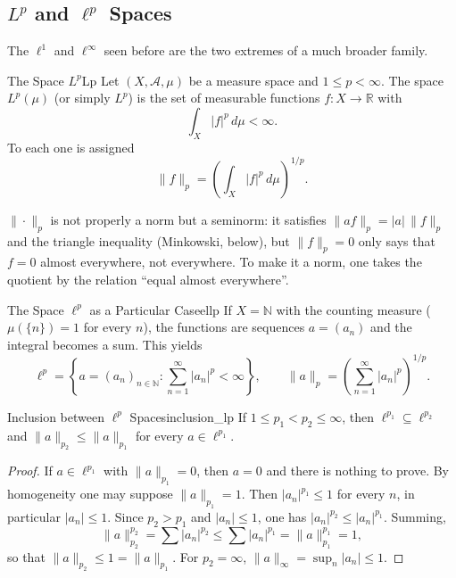 \documentclass[11pt, a4paper]{article}
\begin{document}
\subsection{\texorpdfstring{$L^p$ and $\ell^p$ Spaces}{Lp and lp Spaces}}

The $\ell^1$ and $\ell^\infty$ seen before are the two extremes of a much broader family.

\begin{definicion}{The Space $L^p$}{Lp}
Let $(X, \mathcal{A}, \mu)$ be a measure space and $1 \le p < \infty$. The space $L^p(\mu)$ (or
simply $L^p$) is the set of measurable functions $f: X \to \mathbb{R}$ with
$$ \int_X |f|^p \, d\mu < \infty. $$
To each one is assigned
$$ \|f\|_p = \left( \int_X |f|^p \, d\mu \right)^{1/p}. $$
\end{definicion}

\obs
$\|\cdot\|_p$ is not properly a norm but a seminorm: it satisfies $\|af\|_p = |a|\,\|f\|_p$ and the
triangle inequality (Minkowski, below), but $\|f\|_p = 0$ only says that $f = 0$ almost everywhere, not
everywhere. To make it a norm, one takes the quotient by the relation ``equal almost everywhere''.

\begin{ejemplo}{The Space $\ell^p$ as a Particular Case}{ellp}
If $X = \mathbb{N}$ with the counting measure ($\mu(\{n\}) = 1$ for every $n$), the functions are
sequences $a = (a_n)$ and the integral becomes a sum. This yields
$$ \ell^p = \left\{ a = (a_n)_{n \in \mathbb{N}} : \sum_{n=1}^{\infty} |a_n|^p < \infty \right\},
\qquad \|a\|_p = \left( \sum_{n=1}^{\infty} |a_n|^p \right)^{1/p}. $$
\end{ejemplo}

\begin{proposicion}{Inclusion between $\ell^p$ Spaces}{inclusion_lp}
If $1 \le p_1 < p_2 \le \infty$, then $\ell^{p_1} \subseteq \ell^{p_2}$ and
$\|a\|_{p_2} \le \|a\|_{p_1}$ for every $a \in \ell^{p_1}$.
\end{proposicion}

\begin{proof}
If $a \in \ell^{p_1}$ with $\|a\|_{p_1} = 0$, then $a = 0$ and there is nothing to prove. By
homogeneity one may suppose $\|a\|_{p_1} = 1$. Then $|a_n|^{p_1} \le 1$ for every $n$, in
particular $|a_n| \le 1$. Since $p_2 > p_1$ and $|a_n| \le 1$, one has $|a_n|^{p_2} \le |a_n|^{p_1}$.
Summing,
$$ \|a\|_{p_2}^{p_2} = \sum |a_n|^{p_2} \le \sum |a_n|^{p_1} = \|a\|_{p_1}^{p_1} = 1, $$
so that $\|a\|_{p_2} \le 1 = \|a\|_{p_1}$. For $p_2 = \infty$,
$\|a\|_\infty = \sup_n |a_n| \le 1$.
\end{proof}
\end{document}
